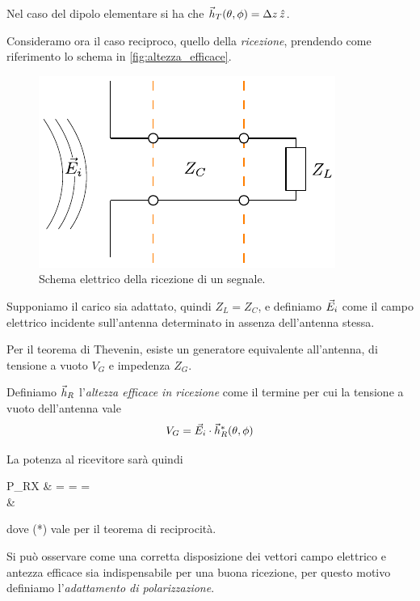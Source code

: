 Nel caso del dipolo elementare si ha che $\vec{h}_T(\theta,\phi) = \Delta z \,\hat{z}$.

\bigbreak
Consideramo ora il caso reciproco, quello della \emph{ricezione}, prendendo come riferimento lo schema in \autoref{fig:altezza_efficace}.

\begin{figure}[htp]
	\centering
	\includegraphics[]{img/altezza_efficace.pdf}
	\caption{Schema elettrico della ricezione di un segnale.}
	\label{fig:altezza_efficace}
\end{figure}

Supponiamo il carico sia adattato, quindi  $Z_L=Z_C$, e definiamo $\vec{E}_i$ come il campo elettrico incidente sull'antenna determinato in assenza dell'antenna stessa.

Per il teorema di Thevenin, esiste un generatore equivalente all'antenna, di tensione a vuoto $V_G$ e impedenza $Z_G$.

Definiamo $\vec{h}_R$ l'\emph{altezza efficace in ricezione} come il termine per cui la tensione a vuoto dell'antenna vale
\begin{equation}
	V_G=\vec{E}_i \cdot \vec{h}_R^*(\theta,\phi)
\end{equation}

La potenza al ricevitore sarà quindi
\begin{esp*}
	P_{RX}
	& = \Re{}
	=  
	=  \\
	& \stackrel{(*)}{=} 
\end{esp*}
dove (*) vale per il teorema di reciprocità.

Si può osservare come una corretta disposizione dei vettori campo elettrico e antezza efficace sia indispensabile per una buona ricezione, per questo motivo definiamo l'\emph{adattamento di polarizzazione}.

